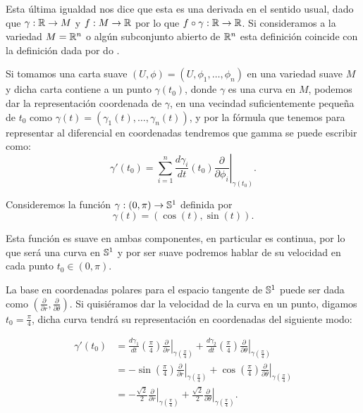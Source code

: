 Esta última igualdad nos dice que esta es una derivada en el sentido usual, dado que $\gamma: \R \to M$ y $f: M \to \R$ por lo que $f \circ \gamma: \R \to \R$. Si consideramos a la variedad $M=\R^n$ o algún subconjunto abierto de $\R^n$ esta definición coincide con la definición dada por do \textcite{do2016differential}.

Si tomamos una carta suave $(U,\phi) = (U,\phi_1,\dots,\phi_n)$ en una variedad suave $M$ y dicha carta contiene a un punto $\gamma(t_0)$, donde $\gamma$ es una curva en $M$, podemos dar la representación coordenada de $\gamma$, en una vecindad suficientemente pequeña de $t_0$ como $\gamma(t) = (\gamma_1(t), \dots, \gamma_n(t))$, y por la fórmula que tenemos para representar al diferencial en coordenadas tendremos que gamma se puede escribir como:
\[
	\gamma'(t_0)=\sum_{i=1}^{n}\frac{d \gamma_i}{dt} (t_0)
	\left. \frac{\partial}{\partial \phi_i} \right|_{\gamma(t_0)}.
\]

\begin{example}
	Consideremos la función $\gamma: (0,\pi) \to \S^{1}$ definida por
	\[
		\gamma(t) = (\cos (t), \sin (t)).
	\]

	Esta función es suave en ambas componentes, en particular es continua, por lo que será una curva en $\S^1$ y por ser suave podremos hablar de su velocidad en cada punto $t_0 \in (0,\pi)$.

	La base en coordenadas polares para el espacio tangente de $\S^{1}$ puede ser dada como $\left( \frac{\partial}{\partial r} , \frac{\partial}{\partial \theta} \right)$. Si quisiéramos dar la velocidad de la curva en un punto, digamos $t_0 = \frac{\pi}{4}$, dicha curva tendrá su representación en coordenadas del siguiente modo:

	\begin{align*}
		\gamma'(t_0) & = \frac{d \gamma_1}{dt}\left( \frac{\pi}{4} \right)
		\left.\frac{\partial}{\partial r} \right|_{\gamma(\frac{\pi}{4})} +
		\frac{d \gamma_2}{dt} \left(\frac{\pi}{4} \right)
		\left.\frac{\partial}{\partial\theta} \right|_{\gamma(\frac{\pi}{4})} \\
		             & = -\sin \left(\frac{\pi}{4}\right)
		\left. \frac{\partial}{\partial r} \right|_{\gamma(\frac{\pi}{4})} +
		\cos \left( \frac{\pi}{4} \right)
		\left.\frac{\partial}{\partial\theta}\right|_{\gamma(\frac{\pi}{4})}  \\
		             & = -\frac{\sqrt{2}}{2}
		\left. \frac{\partial}{\partial r} \right|_{\gamma(\frac{\pi}{4})}
		+ \frac{\sqrt{2}}{2}
		\left. \frac{\partial}{\partial\theta} \right|_{\gamma(\frac{\pi}{4})}.
	\end{align*}
\end{example}

